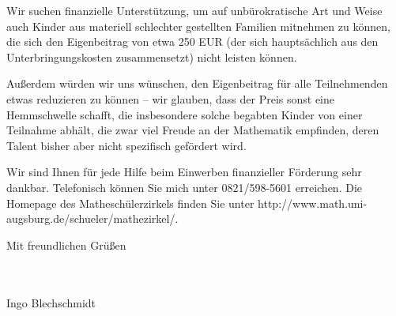 \documentclass{../vorlagen/werbung/lehrerbriefe/zirkelbrief}
\begin{document}
Wir suchen finanzielle Unterstützung, um auf unbürokratische Art und
Weise auch Kinder aus materiell schlechter gestellten Familien mitnehmen
zu können, die sich den Eigenbeitrag von etwa 250 EUR (der sich
hauptsächlich aus den Unterbringungskosten zusammensetzt) nicht leisten
können.

Außerdem würden wir uns wünschen, den Eigenbeitrag für alle
Teilnehmenden etwas reduzieren zu können -- wir glauben, dass der Preis
sonst eine Hemmschwelle schafft, die insbesondere solche begabten Kinder
von einer Teilnahme abhält, die zwar viel Freude an der Mathematik
empfinden, deren Talent bisher aber nicht spezifisch gefördert wird.

Wir sind Ihnen für jede Hilfe beim Einwerben finanzieller Förderung sehr
dankbar. Telefonisch können Sie mich unter 0821/598-5601 erreichen. Die
Homepage des Matheschülerzirkels finden Sie unter
\textsf{http:/\!/www.math.uni-augsburg.de/schue\-ler/mathezirkel/}.

Mit freundlichen Grüßen

\ \\
\ \\

Ingo Blechschmidt
\end{document}
